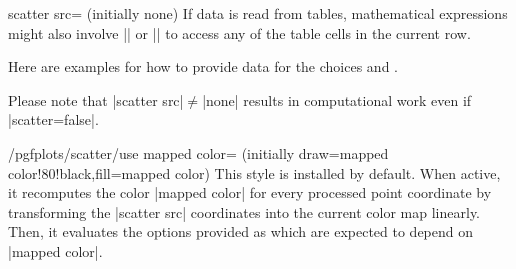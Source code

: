 {\begin{pgfplotskey}{scatter src= (initially none)}
	If data is read from tables, mathematical expressions might also involve |\thisrow| or |\thisrowno| to access any of the table cells in the current row.

	Here are examples for how to provide data for the choices  and .
\begin{codeexample}
\end{codeexample}

	Please note that |scatter src|$\neq$|none| results in computational work even if |scatter=false|.
\end{pgfplotskey}

\begin{stylekey}{/pgfplots/scatter/use mapped color= (initially draw=mapped color!80!black,fill=mapped color)}
	This style is installed by default. When active, it recomputes the color |mapped color| for every processed point coordinate by transforming the |scatter src| coordinates into the current color map linearly. Then, it evaluates the options provided as  which are expected to depend on |mapped color|.


\end{stylekey}}
